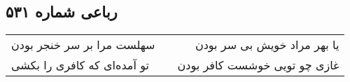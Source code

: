 \begin{center}
\section*{رباعی شماره ۵۳۱}
\label{sec:sh531}
\begin{longtable}{l p{0.5cm} r}
سهلست مرا بر سر خنجر بودن
&&
یا بهر مراد خویش بی سر بودن
\\
تو آمده‌ای که کافری را بکشی
&&
غازی چو تویی خوشست کافر بودن
\\
\end{longtable}
\end{center}
